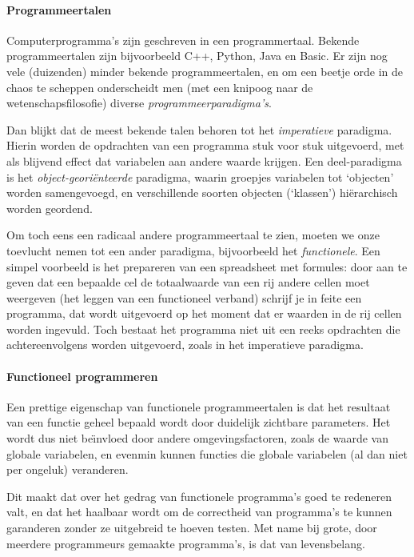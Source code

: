 \documentclass{article}
\begin{document}
\paragraph{Programmeertalen}

Computerprogramma's zijn geschreven in een programmertaal.
Bekende programmeertalen zijn bijvoorbeeld C++, Python, Java en Basic.
Er zijn nog vele (duizenden) minder bekende programmeertalen,
en om een beetje orde in de chaos te scheppen onderscheidt men
(met een knipoog naar de wetenschapsfilosofie) diverse {\em programmeerparadigma's}.

Dan blijkt dat de meest bekende talen behoren tot het {\em imperatieve} paradigma.
Hierin worden de opdrachten van een programma stuk voor stuk uitgevoerd,
met als blijvend effect dat variabelen aan andere waarde krijgen.
Een deel-paradigma  is het {\em object-geori\"enteerde} paradigma,
waarin groepjes variabelen tot `objecten' worden samengevoegd,
en verschillende soorten objecten (`klassen') hi\"erarchisch worden geordend.

Om toch eens een radicaal andere programmeertaal te zien, moeten we onze
toevlucht nemen tot een ander paradigma, bijvoorbeeld het {\em functionele}.
Een simpel voorbeeld is het prepareren van een spreadsheet met formules: door aan te geven
dat een bepaalde cel de totaalwaarde van een rij andere cellen moet weergeven
(het leggen van een functioneel verband) schrijf je in feite een programma,
dat wordt uitgevoerd op het moment dat er waarden in de rij cellen worden ingevuld.
Toch bestaat het programma niet uit een reeks opdrachten die achtereenvolgens
worden uitgevoerd, zoals in het imperatieve paradigma.


\paragraph{Functioneel programmeren}

Een prettige eigenschap van functionele programmeertalen is dat het resultaat
van een functie geheel bepaald wordt door duidelijk zichtbare parameters.
Het wordt dus niet be\"{\i}nvloed door andere omgevingsfactoren,
zoals de waarde van globale variabelen, en evenmin kunnen functies die
globale variabelen (al dan niet per ongeluk) veranderen.

Dit maakt dat over het gedrag van functionele programma's goed te redeneren valt,
en dat het haalbaar wordt om de correctheid van programma's te kunnen garanderen
zonder ze uitgebreid te hoeven testen.
Met name bij grote, door meerdere programmeurs gemaakte programma's, is dat van levensbelang.
\end{document}
